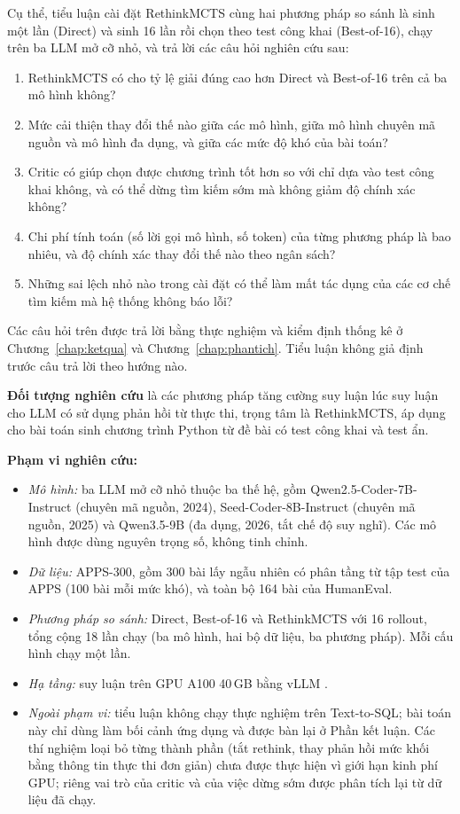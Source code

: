 Cụ thể, tiểu luận cài đặt RethinkMCTS cùng hai phương pháp so sánh là sinh một lần (Direct) và sinh 16 lần rồi chọn theo test công khai (Best-of-16), chạy trên ba LLM mở cỡ nhỏ, và trả lời các câu hỏi nghiên cứu sau:

\begin{enumerate}
  \item RethinkMCTS có cho tỷ lệ giải đúng cao hơn Direct và Best-of-16 trên cả ba mô hình không?
  \item Mức cải thiện thay đổi thế nào giữa các mô hình, giữa mô hình chuyên mã nguồn và mô hình đa dụng, và giữa các mức độ khó của bài toán?
  \item Critic có giúp chọn được chương trình tốt hơn so với chỉ dựa vào test công khai không, và có thể dừng tìm kiếm sớm mà không giảm độ chính xác không?
  \item Chi phí tính toán (số lời gọi mô hình, số token) của từng phương pháp là bao nhiêu, và độ chính xác thay đổi thế nào theo ngân sách?
  \item Những sai lệch nhỏ nào trong cài đặt có thể làm mất tác dụng của các cơ chế tìm kiếm mà hệ thống không báo lỗi?
\end{enumerate}

Các câu hỏi trên được trả lời bằng thực nghiệm và kiểm định thống kê ở Chương~\ref{chap:ketqua} và Chương~\ref{chap:phantich}. Tiểu luận không giả định trước câu trả lời theo hướng nào.


\textbf{Đối tượng nghiên cứu} là các phương pháp tăng cường suy luận lúc suy luận cho LLM có sử dụng phản hồi từ thực thi, trọng tâm là RethinkMCTS, áp dụng cho bài toán sinh chương trình Python từ đề bài có test công khai và test ẩn.

\textbf{Phạm vi nghiên cứu:}
\begin{itemize}
  \item \emph{Mô hình:} ba LLM mở cỡ nhỏ thuộc ba thế hệ, gồm Qwen2.5-Coder-7B-Instruct (chuyên mã nguồn, 2024), Seed-Coder-8B-Instruct (chuyên mã nguồn, 2025) và Qwen3.5-9B (đa dụng, 2026, tắt chế độ suy nghĩ). Các mô hình được dùng nguyên trọng số, không tinh chỉnh.
  \item \emph{Dữ liệu:} APPS-300, gồm 300 bài lấy ngẫu nhiên có phân tầng từ tập test của APPS (100 bài mỗi mức khó), và toàn bộ 164 bài của HumanEval.
  \item \emph{Phương pháp so sánh:} Direct, Best-of-16 và RethinkMCTS với 16 rollout, tổng cộng 18 lần chạy (ba mô hình, hai bộ dữ liệu, ba phương pháp). Mỗi cấu hình chạy một lần.
  \item \emph{Hạ tầng:} suy luận trên GPU A100 40\,GB bằng vLLM \cite{kwon2023vllm}.
  \item \emph{Ngoài phạm vi:} tiểu luận không chạy thực nghiệm trên Text-to-SQL; bài toán này chỉ dùng làm bối cảnh ứng dụng và được bàn lại ở Phần kết luận. Các thí nghiệm loại bỏ từng thành phần (tắt rethink, thay phản hồi mức khối bằng thông tin thực thi đơn giản) chưa được thực hiện vì giới hạn kinh phí GPU; riêng vai trò của critic và của việc dừng sớm được phân tích lại từ dữ liệu đã chạy.
\end{itemize}

